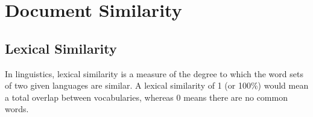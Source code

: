 
\chapter{Document Similarity} %

\label{sim} %



\section{Lexical Similarity}

In linguistics, lexical similarity is a measure of the degree to which the word sets of two given languages  are similar. A lexical similarity of 1 (or 100\%) would mean a total overlap between vocabularies, whereas 0 means there are no common words.\\


